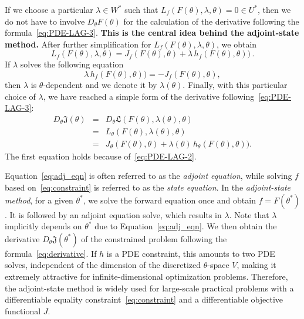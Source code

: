 \documentclass[12pt]{amsart}
\begin{document}
If we choose a particular $\lambda \in W^*$ such that $L_f(F(\theta), \lambda,\theta) = 0 \in U^*$, then we do not have to involve $D_\theta F(\theta)$ for the calculation of the derivative following the formula~\eqref{eq:PDE-LAG-3}.  \textbf{This is the central idea behind the adjoint-state method.} After further simplification for $L_f(F(\theta), \lambda,\theta)$, we obtain
\[
    L_f(F(\theta), \lambda,\theta) = J_f (F(\theta) ,\theta) +   \lambda \, h_f(F(\theta) ,\theta))\,.
\]
If $\lambda$ solves the following equation 
\begin{equation}\label{eq:adj_eqn}
   \lambda \, h_f(F(\theta) ,\theta)) = - J_f (F(\theta) ,\theta),
\end{equation}
then $\lambda$ is $\theta$-dependent and we denote it by $\lambda(\theta)$. Finally, with this particular choice of $\lambda$, we have reached a simple form of the derivative following~\eqref{eq:PDE-LAG-3}:
\begin{eqnarray}
    D_\theta \mathfrak{J}(\theta) & = & D_\theta \mathfrak{L}(F(\theta), \lambda(\theta),\theta) \nonumber \\
    &=& L_\theta (F(\theta), \lambda(\theta),\theta) \nonumber \\
    &=& J_\theta(F(\theta) ,\theta) + \lambda(\theta)\, h_\theta(F(\theta) ,\theta)). \label{eq:derivative}
\end{eqnarray}
The first equation holds because of~\eqref{eq:PDE-LAG-2}.

Equation~\eqref{eq:adj_eqn} is often referred to as the \textit{adjoint equation}, while solving $f$ based on~\eqref{eq:constraint} is referred to as the \textit{state equation}. In the \textit{adjoint-state method}, for a given $\theta^*$, we solve the forward equation once and obtain $f = F(\theta^*)$. It is followed by an adjoint equation solve, which results in $\lambda$. Note that $\lambda$ implicitly  depends on $\theta^*$ due to Equation~\eqref{eq:adj_eqn}. We then obtain the derivative $D_\theta \mathfrak{J}(\theta^*)$ of the constrained problem following the formula~\eqref{eq:derivative}. If $h$ is a PDE constraint, this amounts to two PDE solves, independent of the dimension of the discretized $\theta$-space $V$, making it extremely attractive for infinite-dimensional optimization problems. Therefore, the adjoint-state method is widely used for large-scale practical problems with a differentiable equality constraint~\eqref{eq:constraint} and a differentiable objective functional $J$.
\end{document}
